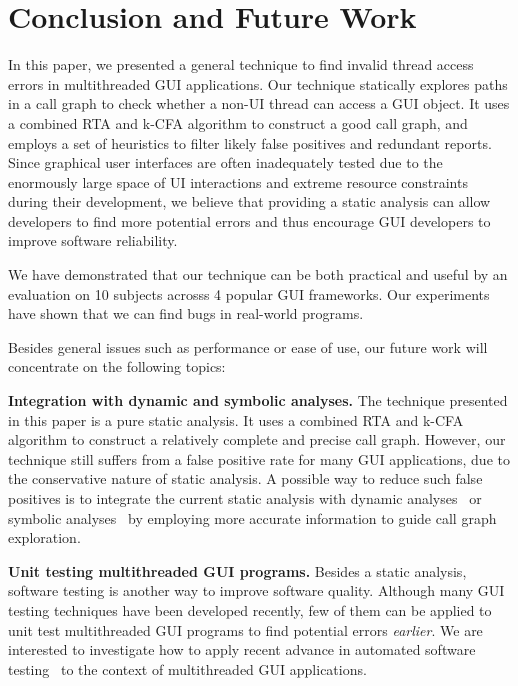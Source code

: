 \section{Conclusion and Future Work}

In this paper, we presented a general technique to find invalid
thread access errors in multithreaded GUI applications. 
Our technique statically explores paths in a call graph to check
whether a non-UI thread can access a GUI object.
It uses a combined RTA and k-CFA algorithm to construct
a good call graph, and employs a set of heuristics to
filter likely false positives and redundant reports.
Since graphical user interfaces are often inadequately tested due
to the enormously large space of UI interactions and
extreme resource constraints during their development, we
believe that providing a static analysis can allow developers to find
more potential errors %
and thus encourage GUI developers to improve software reliability.

We have demonstrated that our technique can be both practical and useful
by an evaluation on 10 subjects acrosss 4 popular GUI
frameworks. Our experiments have shown that we can find bugs
in real-world programs.


Besides general issues such as performance or ease of use, our future
work will concentrate on the following topics:

\textbf{Integration with dynamic and symbolic analyses.} The technique 
presented in this paper is a pure static analysis. It
uses a combined RTA and k-CFA  algorithm to construct a relatively
complete and precise call graph. However, our technique still suffers from
a false positive rate for many GUI applications, due to the conservative
nature of static analysis. A possible way to reduce such false
positives is to integrate the current static analysis with
dynamic analyses~\cite{Jiang:2008:PPS:1453101.1453110, ZhangSBE2011}
or symbolic analyses~\cite{xie05:symstra, Pasareanu:2011, halfond09issta, BMF97}
by employing more accurate information to guide call graph exploration.

\textbf{Unit testing multithreaded GUI programs.} Besides
a static analysis,  software testing is another
way to improve software quality.  Although many
GUI testing techniques have been developed recently, few of them can be applied
to unit test multithreaded GUI programs to find potential errors \textit{earlier}. We
are interested to investigate how to apply recent advance in automated
software testing~\cite{Staats:2011:PTO:1985793.1985847, Jagannath:2011:IMU:2025113.2025145, Muccini_Bertolino_Inverardi_2004, Ricca:2001:ATW:381473.381476, Harman:2007}
to the context of multithreaded GUI applications.


